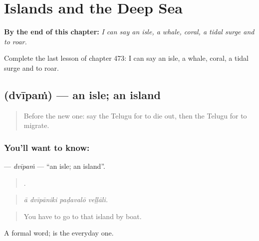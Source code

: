 
\chapter{Islands and the Deep Sea}
\label{ch:te-islands-and-the-deep-sea}

\begin{chapteropening}
\textbf{By the end of this chapter:} \emph{I can say an isle, a whale, coral, a tidal surge and to roar.}

Complete the last lesson of chapter 473: I can say an isle, a whale, coral, a tidal surge and to roar.
\end{chapteropening}

\section[\texorpdfstring{\te{ద్వీపం} (dvīpaṁ)}{ద్వీపం (dvīpaṁ)}]{ (dvīpaṁ) — an isle; an island}

\label{lesson:TE-C473-dvipam}



\begin{quote}
Before the new one: say the Telugu for to die out, then the Telugu for to migrate.
\end{quote}

\subsection*{You'll want to know: }
\textbf{} — \emph{dvīpaṁ} — \textquotedblleft{}an isle; an island\textquotedblright{}.

\begin{quote}
   .
\end{quote}

\begin{quote}
\emph{ā dvīpāniki paḍavalō veḷḷāli.}
\end{quote}

\begin{quote}
You have to go to that island by boat.
\end{quote}

A formal word;  is the everyday one.

